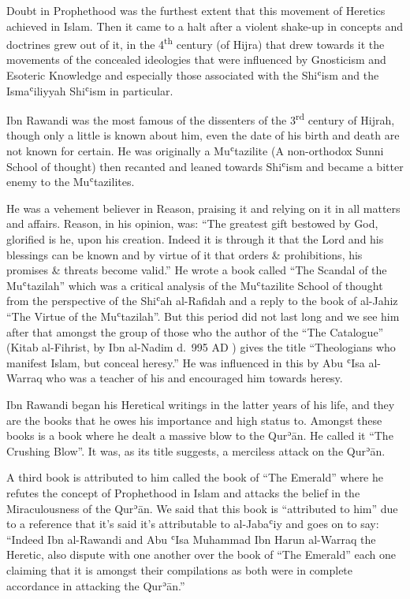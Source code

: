\documentclass[12pt]{memoir}
\def\´{ʾ} %
\def\`{ʿ} %
\let \Sup=\textsuperscript
\def \Quran{Qur\-\´ān} %
\begin{document}
Doubt in Prophethood was the furthest extent that this movement of Heretics
achieved in Islam. Then it came to a halt after a violent shake-up in concepts
and doctrines grew out of it,
in the 4\Sup{th} century (of Hijra) that drew towards
it the movements of the concealed ideologies that were influenced by Gnosticism
and Esoteric Knowledge and especially those associated with the Shi\`ism
and the Isma\`iliyyah Shi\`ism in particular.

Ibn Rawandi was the most famous of the dissenters
of the 3\Sup{rd} century of Hijrah,
though only a little is known about him,
even the date of his birth and death are not known for certain.
He was originally a Mu\`tazilite (A non-orthodox Sunni School of thought)
then recanted and leaned towards Shi\`ism and became
a bitter enemy to the Mu\`tazilites.

He was a vehement believer in Reason, praising it and relying on it in all
matters and affairs. Reason, in his opinion, was: “The greatest gift bestowed
by God, glorified is he, upon his creation. Indeed it is through it that the
Lord and his blessings can be known and by virtue of it that orders \&
prohibitions, his promises \& threats become valid.”\footnotemark\@
He wrote a book called “The Scandal of the Mu\`tazilah”\footnotemark{}
which was a critical analysis of the Mu\`tazilite School of thought
from the perspective of the Shi\`ah al-Rafidah and
a reply to the book of al-Jahiz “The Virtue of the Mu\`tazilah”.
But this period did not last long and we see him after that
amongst the group of those who the author of the “The Catalogue” (Kitab
al-Fihrist, by Ibn al-Nadim d.\ 995 AD ) gives the title “Theologians who
manifest Islam, but conceal heresy.”
He was influenced in this by Abu \`Isa al-Warraq
who was a teacher of his and encouraged him towards heresy.


Ibn Rawandi began his Heretical writings in the latter years of his life, and
they are the books that he owes his importance and high status to. Amongst
these books is a book where he dealt a massive blow to the \Quran. He called it
“The Crushing Blow”. It was, as its title suggests, a merciless attack on the
\Quran.

A third book is attributed to him called the book of “The Emerald” where he
refutes the concept of Prophethood in Islam and attacks the belief in the
Miraculousness of the \Quran. We said that this book is “attributed to him” due
to a reference that it’s said it’s attributable to al-Jaba\`iy and goes on to
say: “Indeed Ibn al-Rawandi and Abu \`Isa Muhammad Ibn Harun al-Warraq the
Heretic, also dispute with one another over the book of “The Emerald” each one
claiming that it is amongst their compilations as both were in complete
accordance in attacking the \Quran.”\footnotemark
\end{document}
